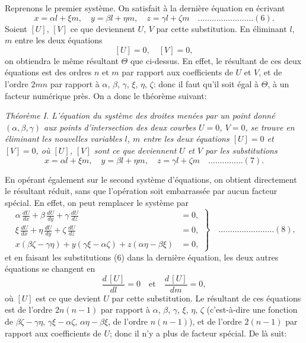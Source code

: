\documentclass[11pt,a4paper]{book}
\begin{document}
Reprenons le premier syst\`eme. On satisfait \`a la derni\`ere \'equation en \'ecrivant
\[
x = \alpha l + \xi m, \quad y = \beta l + \eta m, \quad z = \gamma l + \zeta m \quad \ldots \ldots \ldots \ldots \ldots \ldots \ldots \ldots (6).
\]
Soient $[U]$, $[V]$ ce que deviennent $U$, $V$ par cette substitution. En \'eliminant $l$, $m$ entre les deux \'equations
\[
[U] = 0, \quad [V] = 0,
\]
on obtiendra le m\^eme r\'esultant $\Theta$ que ci-dessus. En effet, le r\'esultant de ces deux \'equations est des ordres $n$ et $m$ par rapport aux coefficients de $U$ et $V$, et de l'ordre $2mn$ par rapport \`a $\alpha$, $\beta$, $\gamma$, $\xi$, $\eta$, $\zeta$: donc il faut qu'il soit \'egal \`a $\Theta$, \`a un facteur num\'erique pr\`es. On a donc le th\'eor\`eme suivant:

\smallskip
\textit{Th\'eor\`eme I. L'\'equation du syst\`eme des droites men\'ees par un point donn\'e $(\alpha, \beta, \gamma)$ aux points d'intersection des deux courbes $U = 0$, $V = 0$, se trouve en \'eliminant les nouvelles variables $l$, $m$ entre les deux \'equations $[U] = 0$ et $[V] = 0$, o\`u $[U]$, $[V]$ sont ce que deviennent $U$ et $V$ par les substitutions
\[
x = \alpha l + \xi m, \quad y = \beta l + \eta m, \quad z = \gamma l + \zeta m \quad \ldots \ldots \ldots \ldots \ldots (7).
\]}
\smallskip

En op\'erant \'egalement sur le second syst\`eme d'\'equations, on obtient directement le r\'esultant r\'eduit, sans que l'op\'eration soit embarrass\'ee par aucun facteur sp\'ecial. En effet, on peut remplacer le syst\`eme par
\[
\left. \begin{aligned}
\alpha\,\frac{dU}{dx} + \beta\,\frac{dU}{dy} + \gamma\,\frac{dU}{dz} &= 0, \\
\xi\,\frac{dU}{dx} + \eta\,\frac{dU}{dy} + \zeta\,\frac{dU}{dz} &= 0, \\
x(\beta\zeta - \gamma\eta) + y(\gamma\xi - \alpha\zeta) + z(\alpha\eta - \beta\xi) &= 0,
\end{aligned} \right\} \quad \ldots \ldots \ldots \ldots \ldots \ldots \ldots \ldots (8),
\]
et en faisant les substitutions (6) dans la derni\`ere \'equation, les deux autres \'equations se changent en
\[
\frac{d\,[U]}{dl} = 0 \quad \text{et} \quad \frac{d\,[U]}{dm} = 0,
\]
o\`u $[U]$ est ce que devient $U$ par cette substitution. Le r\'esultant de ces \'equations est de l'ordre $2n(n-1)$ par rapport \`a $\alpha$, $\beta$, $\gamma$, $\xi$, $\eta$, $\zeta$ (c'est-\`a-dire une fonction de $\beta\zeta - \gamma\eta$, $\gamma\xi - \alpha\zeta$, $\alpha\eta - \beta\xi$, de l'ordre $n(n-1)$), et de l'ordre $2(n-1)$ par rapport aux coefficients de $U$; donc il n'y a plus de facteur sp\'ecial. De l\`a suit:
\end{document}
